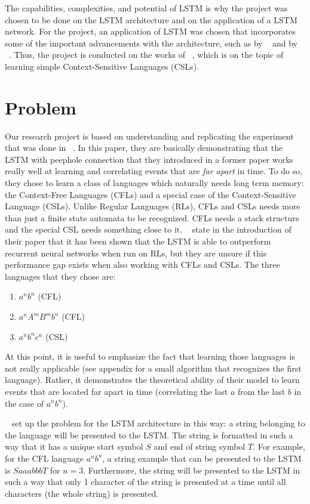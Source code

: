 \documentclass[11pt,letterpaper]{article}
\begin{document}
	The capabilities, complexities, and potential of LSTM is why the project was chosen to be done on the LSTM architecture and on the application of a LSTM network. For the project, an application of LSTM was chosen that incorporates some of the important advancements with the architecture, such as by ~\cite{Gers:99} and by ~\cite{Gers:02}. Thus, the project is conducted on the works of ~\cite{Gers:01}, which is on the topic of learning simple Context-Sensitive Languages (CSLs).

	\section{Problem}
	Our research project is based on understanding and replicating the experiment that was done in ~\cite{Gers:01}.  In this paper, they are basically demonstrating that the LSTM with peephole connection that they introduced in a former paper works really well at learning and correlating events that are \textit{far apart} in time. To do so, they chose to learn a class of languages which naturally needs long term memory: the Context-Free Languages (CFLs) and a special case of the Context-Sensitive Language (CSLs). Unlike Regular Languages (RLs), CFLs and CSLs needs more than just a finite state automata to be recognized. CFLs needs a stack structure and the special CSL needs something close to it. ~\cite{Gers:01} state in the introduction of their paper that it has been shown that the LSTM is able to outperform recurrent neural networks when run on RLs, but they are unsure if this performance gap exists when also working with CFLs and CSLs. The three languages that they chose are:
	\begin{enumerate}
		\item $a^nb^n$ (CFL)
		\item $a^nA^mB^mb^n$ (CFL)
		\item $a^nb^nc^n$ (CSL)
	\end{enumerate}
	At this point, it is useful to emphasize the fact that learning those languages is not really applicable (see appendix for a small algorithm that recognizes the first language). Rather, it demonstrates the theoretical ability of their model to learn events that are located far apart in time (correlating the last $a$ from the last $b$ in the case of $a^nb^n$).

	~\cite{Gers:01} set up the problem for the LSTM architecture in this way: a string belonging to the language will be presented to the LSTM. The string is formatted in such a way that it has a unique start symbol $S$ and end of string symbol $T$. For example, for the CFL language $a^nb^n$, a string example that can be presented to the LSTM is $SaaabbbT$ for $n = 3$. Furthermore, the string will be presented to the LSTM in such a way that only 1 character of the string is presented at a time until all characters (the whole string) is presented.
\end{document}
